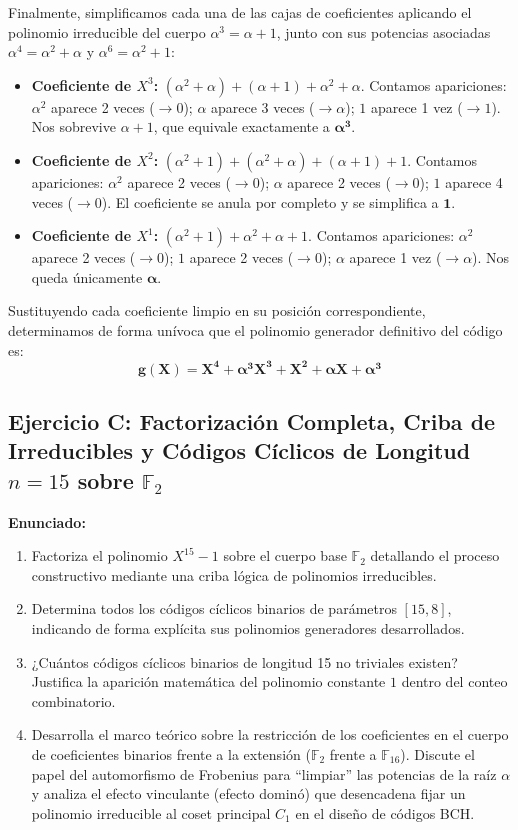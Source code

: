 \documentclass{article}
\begin{document}
Finalmente, simplificamos cada una de las cajas de coeficientes aplicando el polinomio irreducible del cuerpo $\alpha^3 = \alpha + 1$, junto con sus potencias asociadas $\alpha^4 = \alpha^2 + \alpha$ y $\alpha^6 = \alpha^2 + 1$:
\begin{itemize}
    \item \textbf{Coeficiente de $X^3$:} $(\alpha^2 + \alpha) + (\alpha + 1) + \alpha^2 + \alpha$. Contamos apariciones: $\alpha^2$ aparece 2 veces ($\to 0$); $\alpha$ aparece 3 veces ($\to \alpha$); $1$ aparece 1 vez ($\to 1$). Nos sobrevive $\alpha + 1$, que equivale exactamente a $\mathbf{\alpha^3}$.
    \item \textbf{Coeficiente de $X^2$:} $(\alpha^2 + 1) + (\alpha^2 + \alpha) + (\alpha + 1) + 1$. Contamos apariciones: $\alpha^2$ aparece 2 veces ($\to 0$); $\alpha$ aparece 2 veces ($\to 0$); $1$ aparece 4 veces ($\to 0$). El coeficiente se anula por completo y se simplifica a $\mathbf{1}$.
    \item \textbf{Coeficiente de $X^1$:} $(\alpha^2 + 1) + \alpha^2 + \alpha + 1$. Contamos apariciones: $\alpha^2$ aparece 2 veces ($\to 0$); $1$ aparece 2 veces ($\to 0$); $\alpha$ aparece 1 vez ($\to \alpha$). Nos queda únicamente $\mathbf{\alpha}$.
\end{itemize}

Sustituyendo cada coeficiente limpio en su posición correspondiente, determinamos de forma unívoca que el polinomio generador definitivo del código es:
\[ \mathbf{g(X) = X^4 + \alpha^3X^3 + X^2 + \alpha X + \alpha^3} \]




\newpage
\subsection{Ejercicio C: Factorización Completa, Criba de Irreducibles y Códigos Cíclicos de Longitud \texorpdfstring{$n=15$}{n=15} sobre \texorpdfstring{$\mathbb{F}_2$}{F2}}

\textbf{Enunciado:} 
\begin{enumerate}
    \item Factoriza el polinomio $X^{15} - 1$ sobre el cuerpo base $\mathbb{F}_2$ detallando el proceso constructivo mediante una criba lógica de polinomios irreducibles.
    \item Determina todos los códigos cíclicos binarios de parámetros $[15, 8]$, indicando de forma explícita sus polinomios generadores desarrollados.
    \item ¿Cuántos códigos cíclicos binarios de longitud 15 no triviales existen? Justifica la aparición matemática del polinomio constante $1$ dentro del conteo combinatorio.
    \item Desarrolla el marco teórico sobre la restricción de los coeficientes en el cuerpo de coeficientes binarios frente a la extensión ($\mathbb{F}_2$ frente a $\mathbb{F}_{16}$). Discute el papel del automorfismo de Frobenius para ``limpiar'' las potencias de la raíz $\alpha$ y analiza el efecto vinculante (efecto dominó) que desencadena fijar un polinomio irreducible al coset principal $C_1$ en el diseño de códigos BCH.
\end{enumerate}
\end{document}
